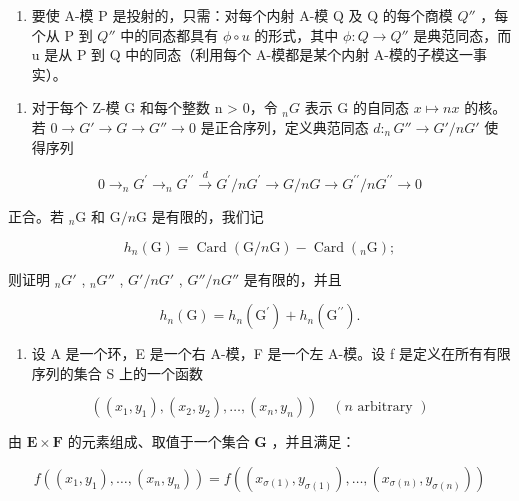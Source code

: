 \begin{enumerate}
\def\labelenumi{(\alph{enumi})}
\setcounter{enumi}{1}
\tightlist
\item
  要使 A-模 P 是投射的，只需：对每个内射 A-模 Q 及 Q 的每个商模 \(Q''\) ，每个从 P 到 \(Q''\) 中的同态都具有 \(\phi \circ u\) 的形式，其中 \(\phi: Q \to Q''\) 是典范同态，而 u 是从 P 到 Q 中的同态（利用每个 A-模都是某个内射 A-模的子模这一事实）。
\end{enumerate}

\begin{enumerate}
\def\labelenumi{\arabic{enumi}.}
\setcounter{enumi}{25}
\tightlist
\item
  对于每个 Z-模 G 和每个整数 n \textgreater{} 0，令 \(_{n}G\) 表示 G 的自同态 \(x \mapsto nx\) 的核。若 \(0 \to G' \to G \to G'' \to 0\) 是正合序列，定义典范同态 \(d:_{n}G'' \to G'/nG'\) 使得序列
\end{enumerate}

\[
0 \longrightarrow_ {n} G ^ {\prime} \longrightarrow_ {n} G ^ {\prime \prime} \stackrel {d} {\longrightarrow} G ^ {\prime} / n G ^ {\prime} \longrightarrow G / n G \longrightarrow G ^ {\prime \prime} / n G ^ {\prime \prime} \longrightarrow 0
\]

正合。若 \(_n\mathrm{G}\) 和 \(\mathrm{G} / n\mathrm{G}\) 是有限的，我们记

\[
h _ {n} (\mathrm{G}) = \operatorname{Card} (\mathrm{G} / n \mathrm{G}) - \operatorname{Card} (_ {n} \mathrm{G});
\]

则证明 \(_{n}G'\) , \(_{n}G''\) , \(G'/nG'\) , \(G''/nG''\) 是有限的，并且

\[
h _ {n} (\mathrm{G}) = h _ {n} \left(\mathrm{G} ^ {\prime}\right) + h _ {n} \left(\mathrm{G} ^ {\prime \prime}\right).
\]

\BourbakiExercisesSection

\begin{enumerate}
\def\labelenumi{\arabic{enumi}.}
\tightlist
\item
  设 A 是一个环，E 是一个右 A-模，F 是一个左 A-模。设 f 是定义在所有有限序列的集合 S 上的一个函数
\end{enumerate}

\[
((x _ {1}, y _ {1}), (x _ {2}, y _ {2}), \dots , (x _ {n}, y _ {n})) \quad (n \text {   arbitrary })
\]

由 \(\mathbf{E} \times \mathbf{F}\) 的元素组成、取值于一个集合 \(\mathbf{G}\) ，并且满足：

\[
f ((x _ {1}, y _ {1}), \dots , (x _ {n}, y _ {n})) = f ((x _ {\sigma (1)}, y _ {\sigma (1)}), \dots , (x _ {\sigma (n)}, y _ {\sigma (n)}))\tag{1}
\]


